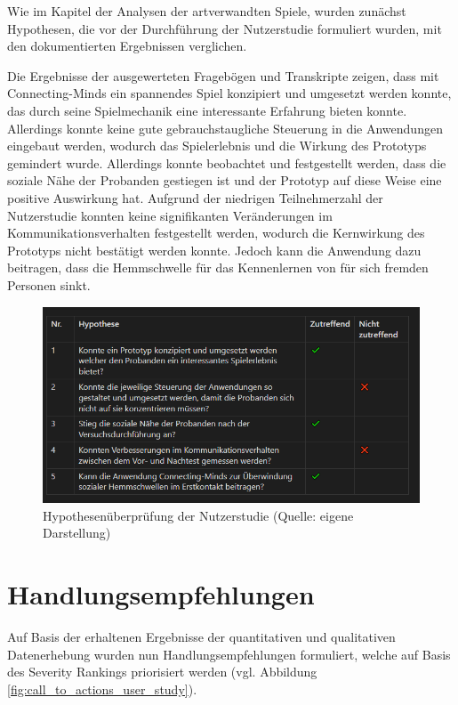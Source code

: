 Wie im Kapitel der Analysen der artverwandten Spiele, wurden zunächst Hypothesen, die vor der Durchführung der Nutzerstudie formuliert wurden, mit den dokumentierten Ergebnissen verglichen. 

Die Ergebnisse der ausgewerteten Fragebögen und Transkripte zeigen, dass mit Connecting-Minds ein spannendes Spiel konzipiert und umgesetzt werden konnte, das durch seine Spielmechanik eine interessante Erfahrung bieten konnte. Allerdings konnte keine gute gebrauchstaugliche Steuerung in die Anwendungen eingebaut werden, wodurch das Spielerlebnis und die Wirkung des Prototyps gemindert wurde. Allerdings konnte beobachtet und festgestellt werden, dass die soziale Nähe der Probanden gestiegen ist und der Prototyp auf diese Weise eine positive Auswirkung hat. Aufgrund der niedrigen Teilnehmerzahl der Nutzerstudie konnten keine signifikanten Veränderungen im Kommunikationsverhalten festgestellt werden, wodurch die Kernwirkung des Prototyps nicht bestätigt werden konnte. Jedoch kann die Anwendung dazu beitragen, dass die Hemmschwelle für das Kennenlernen von für sich fremden Personen sinkt.

\begin{figure}[ht]
\centering
\includegraphics[width=1\linewidth]{content/pictures/Hypothesen_Nutzerstudie.PNG}
\caption{Hypothesenüberprüfung der Nutzerstudie (Quelle: eigene Darstellung)}
\label{fig:hypothesis_user_study}
\end{figure}

\section{Handlungsempfehlungen}
Auf Basis der erhaltenen Ergebnisse der quantitativen und qualitativen Datenerhebung wurden nun Handlungsempfehlungen formuliert, welche auf Basis des Severity Rankings priorisiert werden (vgl. Abbildung \ref{fig:call_to_actions_user_study}).

